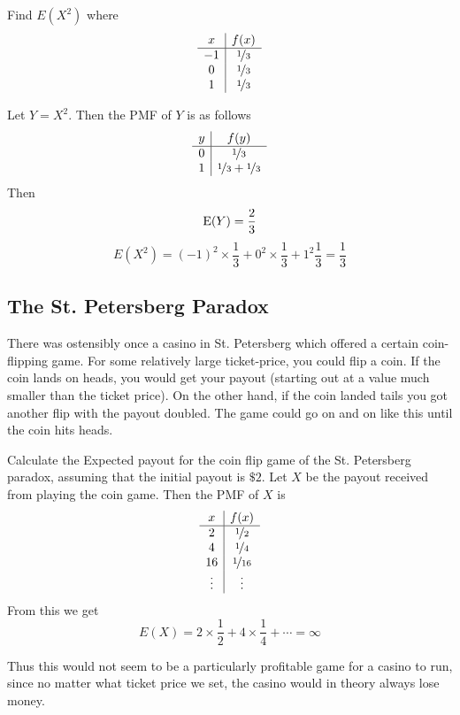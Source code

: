 \begin{example}
    Find $E(X^2)$ where
    \[
        \begin{array}{c|c}
             x & f(x) \\
             \hline
             -1 & \nicefrac 13\\
             0 & \nicefrac 13 \\
             1 & \nicefrac 13
        \end{array}
    \]

    Let $Y=X^2$. Then the PMF of $Y$ is as follows
    \[
        \begin{array}{c|c}
             y & f(y) \\
             \hline
             0 & \nicefrac 13 \\
             1 & \nicefrac 13 + \nicefrac 13
        \end{array}
    \]
    Then 
    \[
        \textup{E}(Y)=\frac 23
    \]
    \[
        E(X^2)=(-1)^2\times \frac 13 + 0^2\times \frac 13 + 1^2 \frac 13 = \frac 13
    \]
\end{example}

\subsection{The St. Petersberg Paradox}
There was ostensibly once a casino in St. Petersberg which offered a certain coin-flipping game. For some relatively large ticket-price, you could flip a coin. If the coin lands on heads, you would get your payout (starting out at a value much smaller than the ticket price). On the other hand, if the coin landed tails you got another flip with the payout doubled. The game could go on and on like this until the coin hits heads.
\begin{example}
    Calculate the Expected payout for the coin flip game of the St. Petersberg paradox, assuming that the initial payout is $\$2$.
    \solution
    Let $X$ be the payout received from playing the coin game. Then the PMF of $X$ is
    \[
        \begin{array}{c|c}
             x & f(x) \\
             \hline
             2 & \nicefrac 12 \\
             4 & \nicefrac 14 \\
             16 & \nicefrac 1{16} \\
             \vdots & \vdots
        \end{array}
    \]
    From this we get
    \[
        E(X) = 2\times \frac 12 + 4 \times \frac 1 4 + \cdots = \infty
    \]
\end{example}
Thus this would not seem to be a particularly profitable game for a casino to run, since no matter what ticket price we set, the casino would in theory always lose money. 

